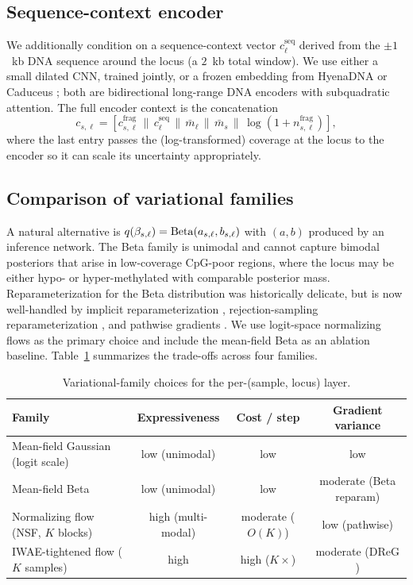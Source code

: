 \subsection{Sequence-context encoder}
We additionally condition on a sequence-context vector $c^{\mathrm{seq}}_\ell$ derived from the $\pm 1$~kb DNA sequence around the locus (a $2$~kb total window). We use either a small dilated CNN, trained jointly, or a frozen embedding from HyenaDNA \citep{nguyen2023hyenadna} or Caduceus \citep{schiff2024caduceus}; both are bidirectional long-range DNA encoders with subquadratic attention. The full encoder context is the concatenation
\begin{equation}
c_{s,\ell}=[c^{\mathrm{frag}}_{s,\ell}\,\|\,c^{\mathrm{seq}}_\ell\,\|\,\bar m_\ell\,\|\,\bar m_s\,\|\,\log(1+n^{\mathrm{frag}}_{s,\ell})],
\end{equation}
where the last entry passes the (log-transformed) coverage at the locus to the encoder so it can scale its uncertainty appropriately.

\subsection{Comparison of variational families}
A natural alternative is $q(\beta_{s,\ell})=\mathrm{Beta}(a_{s,\ell},b_{s,\ell})$ with $(a,b)$ produced by an inference network. The Beta family is unimodal and cannot capture bimodal posteriors that arise in low-coverage CpG-poor regions, where the locus may be either hypo- or hyper-methylated with comparable posterior mass. Reparameterization for the Beta distribution was historically delicate, but is now well-handled by implicit reparameterization \citep{figurnov2018implicit}, rejection-sampling reparameterization \citep{naesseth2017reparam}, and pathwise gradients \citep{jankowiak2018pathwise}. We use logit-space normalizing flows as the primary choice and include the mean-field Beta as an ablation baseline. Table~\ref{tab:vfamily} summarizes the trade-offs across four families.

\begin{table}[h]
\centering\small
\caption{Variational-family choices for the per-(sample, locus) layer.}
\label{tab:vfamily}
\begin{tabular}{lccc}
\toprule
Family & Expressiveness & Cost / step & Gradient variance \\
\midrule
Mean-field Gaussian (logit scale) & low (unimodal) & low & low \\
Mean-field Beta & low (unimodal) & low & moderate (Beta reparam) \\
Normalizing flow (NSF, $K$ blocks) & high (multi-modal) & moderate ($O(K)$) & low (pathwise) \\
IWAE-tightened flow ($K$ samples) & high & high ($K\times$) & moderate (DReG \citealp{tucker2019dreg}) \\
\bottomrule
\end{tabular}
\end{table}

